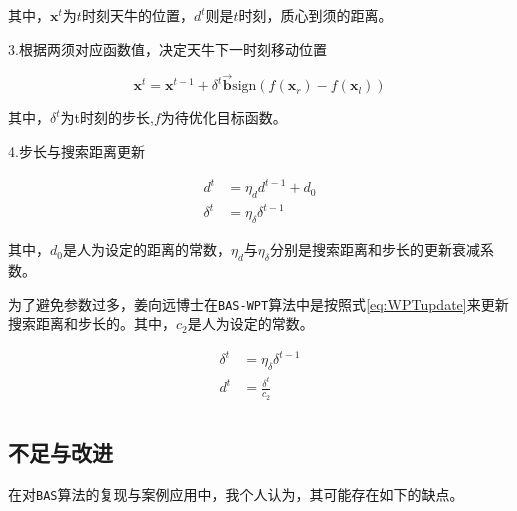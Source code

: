 \documentclass[]{ctexbook}
\theoremstyle{definition}
\theoremstyle{definition}
\theoremstyle{definition}
\theoremstyle{remark}
\begin{document}
其中，\(\mathbf{x}^t\)为\(t\)时刻天牛的位置，\(d^t\)则是\(t\)时刻，质心到须的距离。

3.根据两须对应函数值，决定天牛下一时刻移动位置

\begin{equation}
\mathbf{x}^t=\mathbf{x}^{t-1}+\delta^t\overrightarrow{\mathbf{b}}\text{sign}(f(\mathbf{x}_r)-f(\mathbf{x}_l))
\label{eq:xupdate}
\end{equation}

其中，\(\delta^t\)为t时刻的步长,\(f\)为待优化目标函数。

4.步长与搜索距离更新

\begin{align}
d^t&= \eta_d d^{t-1}+d_0 \label{eq:dupdate}\\
\delta^t&=\eta_{\delta} \delta^{t-1} \label{eq:deltaupdate}
\end{align}

其中，\(d_0\)是人为设定的距离的常数，\(\eta_d\)与\(\eta_\delta\)分别是搜索距离和步长的更新衰减系数。

为了避免参数过多，姜向远博士在\texttt{BAS-WPT}算法中是按照式\eqref{eq:WPTupdate}来更新搜索距离和步长的。其中，\(c_2\)是人为设定的常数。

\begin{equation}
\begin{split}
\delta^t&=\eta_{\delta} \delta^{t-1}\\
d^t &= \frac{\delta^t}{c_2}\\
\end{split}
\label{eq:WPTupdate} 
\end{equation}

\subsection{不足与改进}\label{BASimprove}

在对\texttt{BAS}算法的复现与案例应用中，我个人认为，其可能存在如下的缺点。
\end{document}
